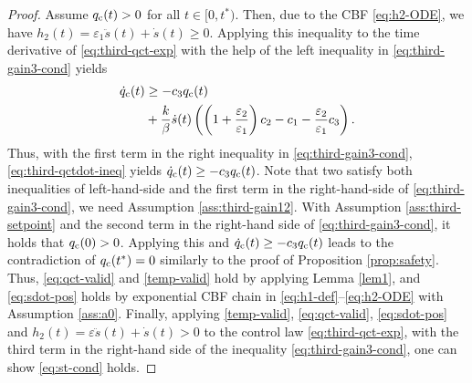 \documentclass[letterpaper, 10 pt, conference]{cls/ieeeconf}
\theoremstyle{definition}
\newcommand{\ep}{\varepsilon}
\begin{document}
\begin{proof}
Assume $q_{\rm c}(t) > 0 $ for all $t \in [0, t^*)$. Then, due to the CBF \eqref{eq:h2-ODE}, we have $h_2(t) = \ep_1 \ddot s(t) + \dot s(t) \geq 0$. Applying this inequality to the time derivative of \eqref{eq:third-qct-exp}  with the help of the left inequality in \eqref{eq:third-gain3-cond} yields
\begin{align}
    \dot q_{\rm c}(t) &\geq - c_3 q_{\rm c}(t) \notag\\
    &+ \frac{k}{\beta} \dot s(t) \left( \left(1 + \frac{\ep_2}{\ep_1} \right) c_2 - c_1  - \frac{ \ep_2}{\ep_1} c_3  \right) . \label{eq:third-qctdot-ineq}
\end{align}
Thus, with the first term in the right inequality in \eqref{eq:third-gain3-cond}, 
\eqref{eq:third-qctdot-ineq} yields $\dot q_{\rm c}(t) \geq - c_3 q_{\rm c}(t)$. Note that two satisfy both inequalities of left-hand-side and the first term in the right-hand-side of \eqref{eq:third-gain3-cond}, we need Assumption \ref{ass:third-gain12}. With Assumption \ref{ass:third-setpoint} and the second term in the right-hand side of \eqref{eq:third-gain3-cond}, it holds that $q_{\rm c}(0) > 0$. Applying this and $\dot q_{\rm c}(t) \geq - c_3 q_{\rm c}(t)$ leads to the contradiction of $q_{\rm c}(t^*) = 0$ similarly to the proof of Proposition \ref{prop:safety}. Thus, \eqref{eq:qct-valid} and \eqref{temp-valid} hold by applying Lemma \ref{lem1}, and \eqref{eq:sdot-pos} holds by exponential CBF chain in \eqref{eq:h1-def}--\eqref{eq:h2-ODE} with Assumption \ref{ass:a0}. Finally, applying \eqref{temp-valid}, \eqref{eq:qct-valid}, \eqref{eq:sdot-pos} and $h_2(t) = \ep \ddot s(t) + \dot s(t) >0$ to the control law \eqref{eq:third-qct-exp}, with the third term in the right-hand side of the inequality \eqref{eq:third-gain3-cond}, one can show \eqref{eq:st-cond} holds. 


\end{proof}
\end{document}
